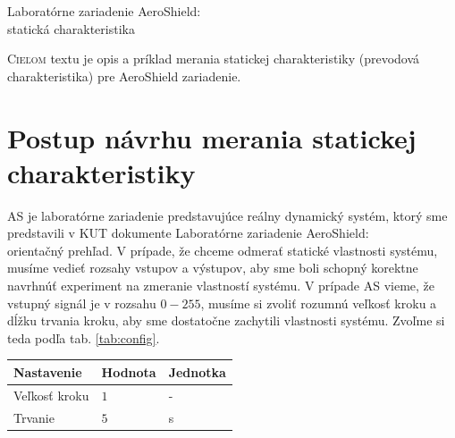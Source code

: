 \documentclass[a4paper, 10pt, ]{article}
\begin{document}
\begin{flushleft}
    Laboratórne zariadenie AeroShield:\\ statická charakteristika
\end{flushleft}

\bigskip

\normalsize
\normalfont

\lstset{style=mystyle}










\noindent
\lettrine[lines=1, nindent=1pt, loversize=0.0]{C}{ieľom}
textu je opis a príklad merania statickej charakteristiky (prevodová charakteristika) pre AeroShield zariadenie.


\section{Postup návrhu merania statickej charakteristiky}

AS je laboratórne zariadenie predstavujúce reálny dynamický systém, ktorý sme predstavili v KUT dokumente Laboratórne zariadenie AeroShield:\\ orientačný prehľad. V prípade, že chceme odmerať statické vlastnosti systému, musíme vedieť rozsahy vstupov a výstupov, aby sme boli schopný korektne navrhnúť experiment na zmeranie vlastností systému.
V prípade AS vieme, že vstupný signál je v rozsahu $0 - 255$, musíme si zvoliť rozumnú veľkosť kroku a dĺžku trvania kroku, aby sme dostatočne zachytili vlastnosti systému. Zvoľme si teda podľa tab. \ref{tab:config}.

\begin{center}

    \vspace{-10pt}

    \label{tab:config}

    \lstyle

    \begin{tabular*}{\textwidth}{@{ \extracolsep{\fill}} lll}
        \toprule
        Nastavenie & Hodnota & Jednotka \\
        \midrule
        Veľkosť kroku & $1$ & - \\
        Trvanie & $5$ & s \\
        \bottomrule
    \end{tabular*}

\end{center}
\end{document}
